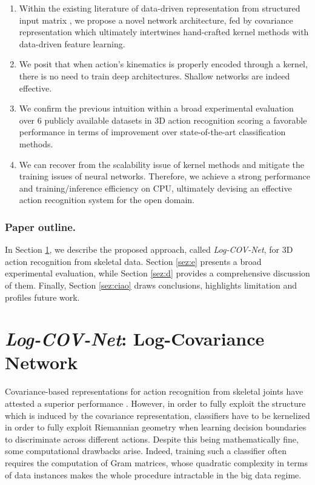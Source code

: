 \documentclass[10pt,twocolumn]{article}
\begin{document}
\begin{enumerate}
	\item Within the existing literature of data-driven representation from structured input matrix \cite{Du:CVPR15,Shahroudy:CVPR16,JCNN1,Liu:ECCV16,JCNN2,deepspd,deeplie}, we propose a novel network architecture, fed by covariance representation which ultimately intertwines hand-crafted kernel methods with data-driven feature learning. 
	\item We posit that when action's kinematics is properly encoded through a kernel, there is no need to train deep architectures. Shallow networks are indeed effective.
	\item We confirm the previous intuition within a broad experimental evaluation over 6 publicly available datasets in 3D action recognition scoring a favorable performance in terms of improvement over state-of-the-art classification methods.
	\item We can recover from the scalability issue of kernel methods and mitigate the training issues of neural networks. Therefore, we achieve a strong performance and training/inference efficiency on CPU, ultimately devising an effective action recognition system for the open domain.
\end{enumerate}





\subsubsection*{Paper outline.} In Section \ref{sez:LCN}, we describe the proposed approach, called \emph{\textit{Log-COV-Net}}, for 3D action recognition from skeletal data. Section \ref{sez:e} presents a broad experimental evaluation, while Section \ref{sez:d} provides a comprehensive discussion of them. Finally, Section \ref{sez:ciao} draws conclusions, highlights limitation and profiles future work.

\section{\textit{Log-COV-Net}: Log-Covariance Network}\label{sez:LCN}



Covariance-based representations for action recognition from skeletal joints have attested a superior performance \cite{egizi,Harandi:CVPR14,Wang:ICCV15,Minh:CVPR16,Cavazza:ICPR16}. However, in order to fully exploit the structure which is induced by the covariance representation, classifiers have to be kernelized in order to fully exploit Riemannian geometry when learning decision boundaries to discriminate across different actions. Despite this being mathematically fine, some computational drawbacks arise. Indeed, training such a classifier often requires the computation of Gram matrices, whose quadratic complexity in terms of data instances makes the whole procedure intractable in the big data regime. 
\end{document}
